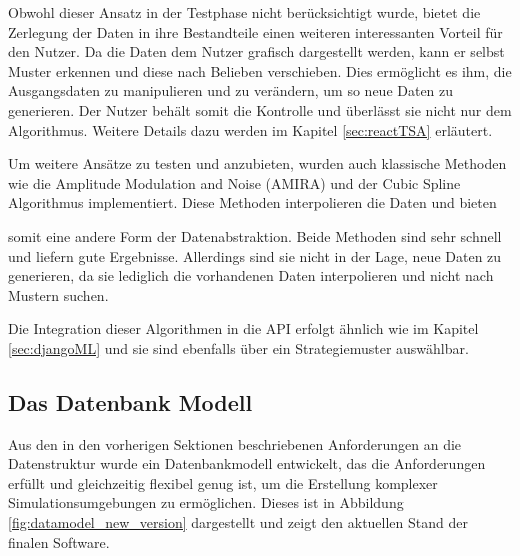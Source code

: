 Obwohl dieser Ansatz in der Testphase nicht berücksichtigt wurde, bietet die Zerlegung der Daten in ihre Bestandteile einen weiteren interessanten Vorteil für den Nutzer. Da die Daten dem Nutzer grafisch dargestellt werden, 
kann er selbst Muster erkennen und diese nach Belieben verschieben. Dies ermöglicht es ihm, die Ausgangsdaten zu manipulieren und zu verändern, um so neue Daten zu generieren. Der Nutzer behält somit die Kontrolle 
und überlässt sie nicht nur dem Algorithmus. Weitere Details dazu werden im Kapitel \ref{sec:reactTSA} erläutert.

Um weitere Ansätze zu testen und anzubieten, wurden auch klassische Methoden wie die Amplitude Modulation and Noise (AMIRA) und der Cubic Spline Algorithmus implementiert. Diese Methoden interpolieren die Daten und bieten 


somit eine andere Form der Datenabstraktion. Beide Methoden sind sehr schnell und liefern gute Ergebnisse. Allerdings sind sie nicht in der Lage, neue Daten zu generieren, da sie lediglich die vorhandenen Daten interpolieren und nicht nach Mustern suchen.

Die Integration dieser Algorithmen in die API erfolgt ähnlich wie im Kapitel \ref{sec:djangoML} und sie sind ebenfalls über ein Strategiemuster auswählbar.



\subsection{Das Datenbank Modell}

Aus den in den vorherigen Sektionen beschriebenen Anforderungen an die Datenstruktur wurde ein Datenbankmodell entwickelt, das die Anforderungen erfüllt und gleichzeitig flexibel genug ist, um die Erstellung komplexer Simulationsumgebungen zu ermöglichen.
Dieses ist in Abbildung \ref{fig:datamodel_new_version} dargestellt und zeigt den aktuellen Stand der finalen Software.


